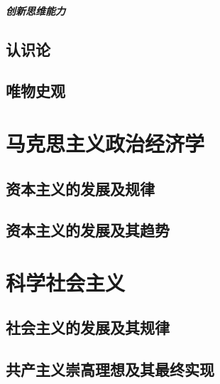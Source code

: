 \documentclass[10pt, UTF8]{book} %
\renewcommand{\chaptermark}[1]{\markboth{第 \thechapter 章 \hspace{1em} #1}{}}
\begin{document}
\subsubsection{创新思维能力}

\newpage
\thispagestyle{empty}

\chapter{认识论}
\chapter{唯物史观}

\part{马克思主义政治经济学}

\chapter{资本主义的发展及规律}
\chapter{资本主义的发展及其趋势}

\part{科学社会主义}

\chapter{社会主义的发展及其规律}
\chapter{共产主义崇高理想及其最终实现}

\appendix
\renewcommand{\chaptermark}[1]{\markboth{附录 \thechapter\, #1}{}}

\end{document}
